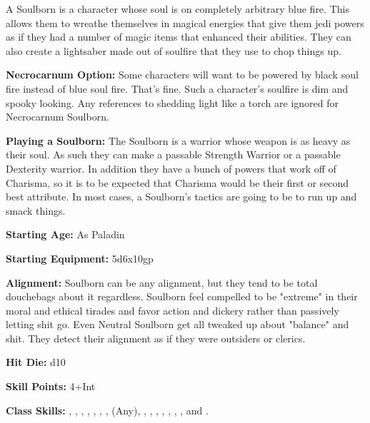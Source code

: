 
A Soulborn is a character whose soul is on completely arbitrary blue fire. This allows them to wreathe themselves in magical energies that give them jedi powers as if they had a number of magic items that enhanced their abilities. They can also create a lightsaber made out of soulfire that they use to chop things up.

\textbf{Necrocarnum Option:} Some characters will want to be powered by black soul fire instead of blue soul fire. That's fine. Such a character's soulfire is dim and spooky looking. Any references to shedding light like a torch are ignored for Necrocarnum Soulborn.

\textbf{Playing a Soulborn:} The Soulborn is a warrior whose weapon is as heavy as their soul. As such they can make a passable Strength Warrior or a passable Dexterity warrior. In addition they have a bunch of powers that work off of Charisma, so it is to be expected that Charisma would be their first or second best attribute. In most cases, a Soulborn's tactics are going to be to run up and smack things.

\textbf{Starting Age:} As Paladin

\textbf{Starting Equipment:} 5d6x10gp

\textbf{Alignment:} Soulborn can be any alignment, but they tend to be total douchebags about it regardless. Soulborn feel compelled to be "extreme" in their moral and ethical tirades and favor action and dickery rather than passively letting shit go. Even Neutral Soulborn get all tweaked up about "balance" and shit. They detect their alignment as if they were outsiders or clerics.

\textbf{Hit Die:} d10

\goodbab{}

\goodfor{}
\poorref{}
\goodwil{}

\textbf{Skill Points:} 4+Int

\textbf{Class Skills:} , , , , , , ,  (Any), , , , , , , , and .

